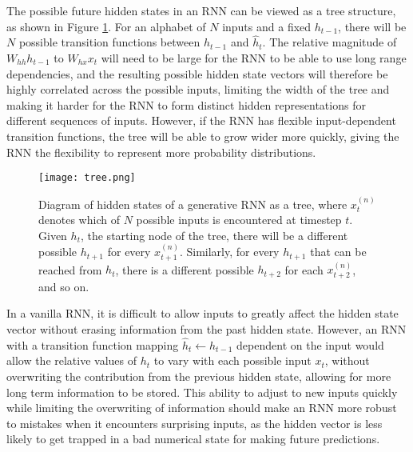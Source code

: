 \documentclass{article}
\begin{document}
The possible future hidden states in an RNN can be viewed as a tree structure, as shown in Figure \ref{fig:tree}. For an alphabet of $N$ inputs and a fixed $h_{t-1}$, there will be $N$ possible transition functions between $h_{t-1}$ and $\hat{h}_t$. The relative magnitude of $W_{hh}h_{t-1}$ to $W_{hx}x_{t}$ will need to be large for the RNN to be able to use long range dependencies, and the resulting possible hidden state vectors will therefore be highly correlated across the possible inputs, limiting the width of the tree and making it harder for the RNN to form distinct hidden representations for different sequences of inputs. However, if the RNN has flexible input-dependent transition functions,  the tree will be able to grow wider more quickly, giving the RNN the flexibility to represent more probability distributions.

\begin{figure}[tb]
\texttt{[image: tree.png]}
\caption{Diagram of hidden states of a generative RNN as a tree, where $x_{t}^{(n)}$ denotes which of $N$ possible inputs is encountered at timestep $t$. Given $h_t$, the starting node of the tree, there will be a different possible $h_{t+1}$ for every $x_{t+1}^{(n)}$.  Similarly, for every $h_{t+1}$ that can be reached from  $h_t$, there is a different possible $h_{t+2}$ for each $x_{t+2}^{(n)}$, and so on.}
\label{fig:tree}
\end{figure}

In a vanilla RNN, it is difficult to allow inputs to greatly affect the hidden state vector without erasing information from the past hidden state. However,  an RNN with a transition function mapping $\hat{h}_t \leftarrow h_{t-1}$ dependent on the input would allow the relative values of $h_{t}$ to vary with each possible input $x_{t}$, without overwriting the contribution from the previous hidden state, allowing for more long term information to be stored. This ability to adjust to new inputs quickly while limiting the overwriting of information should make an RNN more robust to mistakes when it encounters surprising inputs, as the hidden vector is less likely to get trapped in a bad numerical state for making future predictions.  
\end{document}
